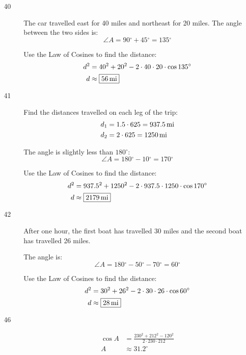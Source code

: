 \documentclass{exam}
\newcommand{\dg}{\ensuremath{^\circ}}
\begin{document}
\begin{description}
      \item[40]
        The car travelled east for 40 miles and northeast for 20 miles.  The angle between the two sides is:
        \[
          \angle A = 90 \dg + 45 \dg = 135 \dg
        \]

        Use the Law of Cosines to find the distance:
        \begin{align*}
          d^2 & = 40^2 + 20^2 - 2 \cdot 40 \cdot 20 \cdot \cos 135 \dg \\
          d   & \approx \boxed{ \unit[56]{mi} } \\
        \end{align*}

      \item[41]
        Find the distances travelled on each leg of the trip:
        \begin{align*}
          d_1 &= 1.5 \cdot 625 = \unit[937.5]{mi} \\
          d_2 &= 2 \cdot 625 = \unit[1250]{mi} \\
        \end{align*}

        The angle is slightly less than $180 \dg$:
        \[
          \angle A = 180 \dg - 10 \dg = 170 \dg
        \]

        Use the Law of Cosines to find the distance:
        \begin{align*}
          d^2 & = 937.5^2 + 1250^2 - 2 \cdot 937.5 \cdot 1250 \cdot \cos 170 \dg \\
          d   & \approx \boxed{ \unit[2179]{mi} } \\
        \end{align*}

      \item[42]
        After one hour, the first boat has travelled 30 miles and the second boat has travelled 26 miles.

        The angle is:
        \[
          \angle A = 180 \dg - 50 \dg - 70 \dg = 60 \dg
        \]

        Use the Law of Cosines to find the distance:
        \begin{align*}
          d^2 & = 30^2 + 26^2 - 2 \cdot 30 \cdot 26 \cdot \cos 60 \dg \\
          d   & \approx \boxed{ \unit[28]{mi} } \\
        \end{align*}

      \item[46]
        \begin{align*}
          \cos A & = \frac{230^2 + 212^2 - 120^2}{2 \cdot 230 \cdot 212} \\
          A      & \approx \boxed{ 31.2 \dg } \\
        \end{align*}


\end{description}
\end{document}
